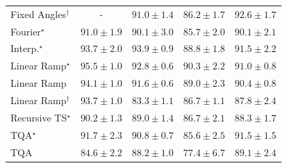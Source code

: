 \begin{tabular}{l|cccc|}
Fixed Angles$^\dagger$ & {\cellcolor[HTML]{000000}} \color[HTML]{F1F1F1} {\cellcolor{white}} \color{black} - & {\cellcolor[HTML]{076D39}} \color[HTML]{F1F1F1} $91.0\pm 1.4$ & {\cellcolor[HTML]{248644}} \color[HTML]{F1F1F1} $86.2\pm 1.7$ & {\cellcolor[HTML]{006536}} \color[HTML]{F1F1F1} $92.6\pm 1.7$ \\
Fourier$^\star$ & {\cellcolor[HTML]{076D39}} \color[HTML]{F1F1F1} $91.0\pm 1.9$ & {\cellcolor[HTML]{0C723B}} \color[HTML]{F1F1F1} $90.1\pm 3.0$ & {\cellcolor[HTML]{278946}} \color[HTML]{F1F1F1} $85.7\pm 2.0$ & {\cellcolor[HTML]{0C723B}} \color[HTML]{F1F1F1} $90.1\pm 2.1$ \\
Interp.$^\star$ & {\cellcolor[HTML]{005E33}} \color[HTML]{F1F1F1} $93.7\pm 2.0$ & {\cellcolor[HTML]{005D33}} \color[HTML]{F1F1F1} $93.9\pm 0.9$ & {\cellcolor[HTML]{15793E}} \color[HTML]{F1F1F1} $88.8\pm 1.8$ & {\cellcolor[HTML]{056C39}} \color[HTML]{F1F1F1} $91.5\pm 2.2$ \\
Linear Ramp$^\star$ & {\cellcolor[HTML]{00532F}} \color[HTML]{F1F1F1} $95.5\pm 1.0$ & {\cellcolor[HTML]{006435}} \color[HTML]{F1F1F1} $92.8\pm 0.6$ & {\cellcolor[HTML]{0B713B}} \color[HTML]{F1F1F1} $90.3\pm 2.2$ & {\cellcolor[HTML]{076D39}} \color[HTML]{F1F1F1} $91.0\pm 0.8$ \\
Linear Ramp & {\cellcolor[HTML]{005C32}} \color[HTML]{F1F1F1} $94.1\pm 1.0$ & {\cellcolor[HTML]{036B38}} \color[HTML]{F1F1F1} $91.6\pm 0.6$ & {\cellcolor[HTML]{13773D}} \color[HTML]{F1F1F1} $89.0\pm 2.3$ & {\cellcolor[HTML]{0B713B}} \color[HTML]{F1F1F1} $90.4\pm 0.8$ \\
Linear Ramp$^\dagger$ & {\cellcolor[HTML]{005E33}} \color[HTML]{F1F1F1} $93.7\pm 1.0$ & {\cellcolor[HTML]{339951}} \color[HTML]{F1F1F1} $83.3\pm 1.1$ & {\cellcolor[HTML]{218242}} \color[HTML]{F1F1F1} $86.7\pm 1.1$ & {\cellcolor[HTML]{1A7D40}} \color[HTML]{F1F1F1} $87.8\pm 2.4$ \\
Recursive TS$^\star$ & {\cellcolor[HTML]{0C723B}} \color[HTML]{F1F1F1} $90.2\pm 1.3$ & {\cellcolor[HTML]{13773D}} \color[HTML]{F1F1F1} $89.0\pm 1.4$ & {\cellcolor[HTML]{218242}} \color[HTML]{F1F1F1} $86.7\pm 2.1$ & {\cellcolor[HTML]{177B3F}} \color[HTML]{F1F1F1} $88.3\pm 1.7$ \\
TQA$^\star$ & {\cellcolor[HTML]{026A38}} \color[HTML]{F1F1F1} $91.7\pm 2.3$ & {\cellcolor[HTML]{086E3A}} \color[HTML]{F1F1F1} $90.8\pm 0.7$ & {\cellcolor[HTML]{278946}} \color[HTML]{F1F1F1} $85.6\pm 2.5$ & {\cellcolor[HTML]{056C39}} \color[HTML]{F1F1F1} $91.5\pm 1.5$ \\
TQA & {\cellcolor[HTML]{2D914B}} \color[HTML]{F1F1F1} $84.6\pm 2.2$ & {\cellcolor[HTML]{187B3F}} \color[HTML]{F1F1F1} $88.2\pm 1.0$ & {\cellcolor[HTML]{61BB6D}} \color[HTML]{F1F1F1} $77.4\pm 6.7$ & {\cellcolor[HTML]{13773D}} \color[HTML]{F1F1F1} $89.1\pm 2.4$ \\

\end{tabular}
